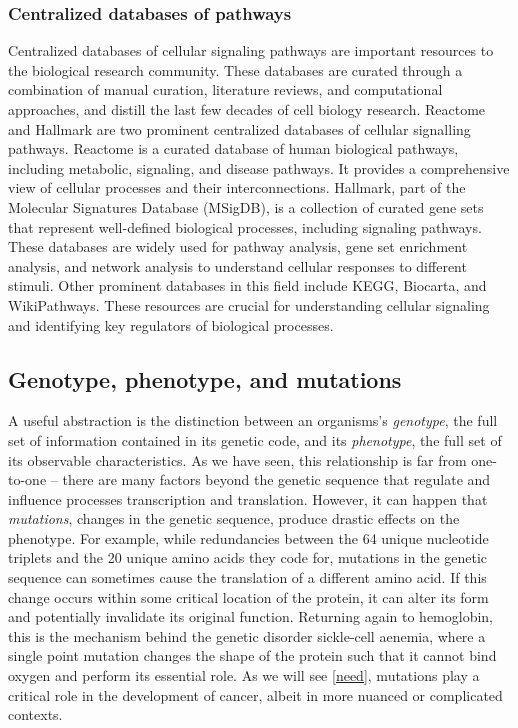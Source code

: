 \subsubsection{Centralized databases of pathways}
Centralized databases of cellular signaling pathways are important resources to the biological research community.
These databases are curated through a combination of manual curation, literature reviews, and computational approaches, and distill the last few decades of cell biology research.
Reactome and Hallmark are two prominent centralized databases of cellular signalling pathways.
Reactome is a curated database of human biological pathways, including metabolic, signaling, and disease pathways.
It provides a comprehensive view of cellular processes and their interconnections.
Hallmark, part of the Molecular Signatures Database (MSigDB), is a collection of curated gene sets that represent well-defined biological processes, including signaling pathways.
These databases are widely used for pathway analysis, gene set enrichment analysis, and network analysis to understand cellular responses to different stimuli.
Other prominent databases in this field include KEGG, Biocarta, and WikiPathways.
These resources are crucial for understanding cellular signaling and identifying key regulators of biological processes.

\subsection{Genotype, phenotype, and mutations}
A useful abstraction is the distinction between an organisms's \emph{genotype}, the full set of information contained in its genetic code, and its \emph{phenotype}, the full set of its observable characteristics.
As we have seen, this relationship is far from one-to-one -- there are many factors beyond the genetic sequence that regulate and influence processes transcription and translation.
However, it can happen that \emph{mutations}, changes in the genetic sequence, produce drastic effects on the phenotype.
For example, while redundancies between the 64 unique nucleotide triplets and the 20 unique amino acids they code for, mutations in the genetic sequence can sometimes cause the translation of a different amino acid.
If this change occurs within some critical location of the protein, it can alter its form and potentially invalidate its original function.
Returning again to hemoglobin, this is the mechanism behind the genetic disorder sickle-cell aenemia, where a single point mutation changes the shape of the protein such that it cannot bind oxygen and perform its essential role.
As we will see \ref{need}, mutations play a critical role in the development of cancer, albeit in more nuanced or complicated contexts.

